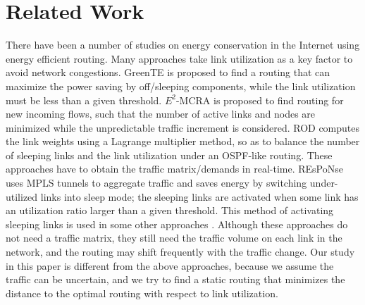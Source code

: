 \documentclass[conference]{IEEEtran}
\begin{document}
\section{Related Work}
\label{related_work}
There have been a number of studies on energy conservation in the Internet using energy efficient routing. Many approaches take link utilization as a key factor to avoid network congestions. GreenTE \cite{networking:greente} is proposed to find a routing that can maximize the power saving by off/sleeping components, while the link utilization must be less than a given threshold. $E^2$-MCRA \cite{networking:active} is proposed to find routing for new incoming flows, such that the number of active links and nodes are minimized while the unpredictable traffic increment is considered. ROD \cite{ROD2012Networking} computes the link weights using a Lagrange multiplier method, so as to balance the number of sleeping links and the link utilization under an OSPF-like routing. These approaches have to obtain the traffic matrix/demands in real-time. REsPoNse \cite{Response11Conext} uses MPLS tunnels to aggregate traffic and saves energy by switching under-utilized links into sleep mode; the sleeping links are activated when some link has an utilization ratio larger than a given threshold. This method of activating sleeping links is used in some other approaches \cite{networking:car}\cite{networking:dmp}\cite{networking:grida}\cite{networking:greenfrr}\cite{SPEED14TON}. Although these approaches do not need a traffic matrix, they still need the traffic volume on each link in the network, and the routing may shift frequently with the traffic change. Our study in this paper is different from the above approaches, because we assume the traffic can be uncertain, and we try to find a static routing that minimizes the distance to the optimal routing with respect to link utilization.
\end{document}
